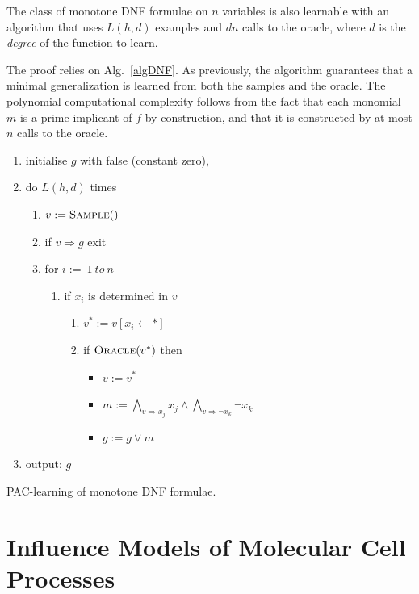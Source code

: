 \documentclass{llncs}
\begin{document}
\begin{theorem}\label{thm:mdnf}
    The class of monotone DNF formulae on $n$ variables is also learnable with an
    algorithm that uses $L(h,d)$ examples and $d n$ calls to the oracle,
    where $d$ is the \emph{degree} of the function to learn.
\end{theorem}

The proof relies on Alg.~\ref{algDNF}. As previously, the algorithm guarantees that a minimal generalization is learned from both the samples and the oracle.
The polynomial computational complexity follows from the fact that each monomial $m$ is a prime implicant
of $f$ by construction, and that it is constructed by at most $n$ calls to the
oracle.

\begin{algorithm}
\begin{enumerate}
\item initialise $g$ with false (constant zero),
\item
do $L(h,d)$ times 
\begin{enumerate}
\item $v:=\textsc{Sample}()$
	\item 
	if $v\Rightarrow g$ exit
\item for $i:=\ 1\ to \ n$
\begin{enumerate}
\item if $x_i$ is determined in $v$
\begin{enumerate}
\item $v^*:=v[x_i\leftarrow *]$
\item if $\textsc{Oracle}(v^*)$ then 
\begin{itemize}
\item $v:=v^*$
\item $m:=\bigwedge_{v\Rightarrow x_j} x_j\wedge\bigwedge_{v\Rightarrow\neg x_k}\neg x_k$ 
\item $g:=g\vee m$
\end{itemize}
\end{enumerate}
\end{enumerate}
\end{enumerate}
\item output: $g$
\end{enumerate}
\caption{PAC-learning of monotone DNF formulae.\label{algDNF}}
\end{algorithm}





\section{Influence Models of Molecular Cell Processes}
\end{document}
